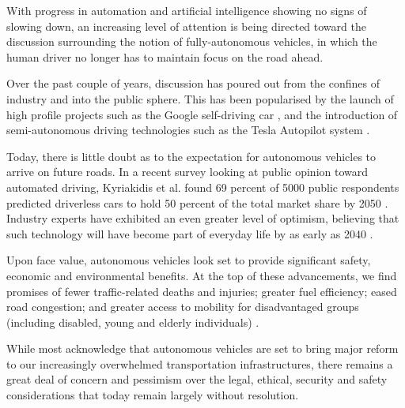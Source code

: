 \documentclass[conference]{IEEEtran}
\begin{document}
With progress in automation and artificial intelligence showing no signs of slowing down, an increasing level of attention is being directed toward the discussion surrounding the notion of fully-autonomous vehicles, in which the human driver no longer has to maintain focus on the road ahead.

 Over the past couple of years, discussion has poured out from the confines of industry and into the public sphere. This has been popularised by the launch of high profile projects such as the Google self-driving car \cite{google-project}, and the introduction of semi-autonomous driving technologies such as the Tesla Autopilot system \cite{tesla-autopilot}.
 
 Today, there is little doubt as to the expectation for autonomous vehicles to arrive on future roads. In a recent survey looking at public opinion toward automated driving, Kyriakidis et al. found 69 percent of 5000 public respondents predicted driverless cars to hold 50 percent of the total market share by 2050 \cite{kyriakidis}. Industry experts have exhibited an even greater level of optimism, believing that such technology will have become part of everyday life by as early as 2040 \cite{action-for-roads}.
 
 Upon face value, autonomous vehicles look set to provide significant safety, economic and environmental benefits. At the top of these advancements, we find promises of fewer traffic-related deaths and injuries; greater fuel efficiency; eased road congestion; and greater access to mobility for disadvantaged groups (including disabled, young and elderly individuals) \cite{action-for-roads}. 
 
While most acknowledge that autonomous vehicles are set to bring major reform to our increasingly overwhelmed transportation infrastructures, there remains a great deal of concern and pessimism over the legal, ethical, security and safety considerations that today remain largely without resolution. 
%
%


\end{document}
